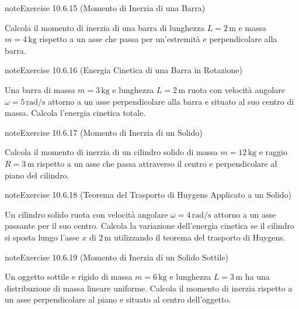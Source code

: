 \documentclass[letterpaper,10pt,italian]{jupyterBook}
\begin{document}
\begin{sphinxadmonition}{note}{Exercise 10.6.15 (Momento di Inerzia di una Barra)}



\sphinxAtStartPar
Calcola il momento di inerzia di una barra di lunghezza \(L = 2 \, \text{m}\) e massa \(m = 4 \, \text{kg}\) rispetto a un asse che passa per un’estremità e perpendicolare alla barra.
\end{sphinxadmonition}
 \label{exercise:ch/mechanics/inertia-problems-exercise-15}

\begin{sphinxadmonition}{note}{Exercise 10.6.16 (Energia Cinetica di una Barra in Rotazione)}



\sphinxAtStartPar
Una barra di massa \(m = 3 \, \text{kg}\) e lunghezza \(L = 2 \, \text{m}\) ruota con velocità angolare \(\omega = 5 \, \text{rad/s}\) attorno a un asse perpendicolare alla barra e situato al suo centro di massa. Calcola l’energia cinetica totale.
\end{sphinxadmonition}
 \label{exercise:ch/mechanics/inertia-problems-exercise-16}

\begin{sphinxadmonition}{note}{Exercise 10.6.17 (Momento di Inerzia di un Solido)}



\sphinxAtStartPar
Calcola il momento di inerzia di un cilindro solido di massa \(m = 12 \, \text{kg}\) e raggio \(R = 3 \, \text{m}\) rispetto a un asse che passa attraverso il centro e perpendicolare al piano del cilindro.
\end{sphinxadmonition}
 \label{exercise:ch/mechanics/inertia-problems-exercise-17}

\begin{sphinxadmonition}{note}{Exercise 10.6.18 (Teorema del Trasporto di Huygens Applicato a un Solido)}



\sphinxAtStartPar
Un cilindro solido ruota con velocità angolare \(\omega = 4 \, \text{rad/s}\) attorno a un asse passante per il suo centro. Calcola la variazione dell’energia cinetica se il cilindro si sposta lungo l’asse \(x\) di \(2 \, \text{m}\) utilizzando il teorema del trasporto di Huygens.
\end{sphinxadmonition}
 \label{exercise:ch/mechanics/inertia-problems-exercise-18}

\begin{sphinxadmonition}{note}{Exercise 10.6.19 (Momento di Inerzia di un Solido Sottile)}



\sphinxAtStartPar
Un oggetto sottile e rigido di massa \(m = 6 \, \text{kg}\) e lunghezza \(L = 3 \, \text{m}\) ha una distribuzione di massa lineare uniforme. Calcola il momento di inerzia rispetto a un asse perpendicolare al piano e situato al centro dell’oggetto.
\end{sphinxadmonition}
 \label{exercise:ch/mechanics/inertia-problems-exercise-19}
\end{document}
